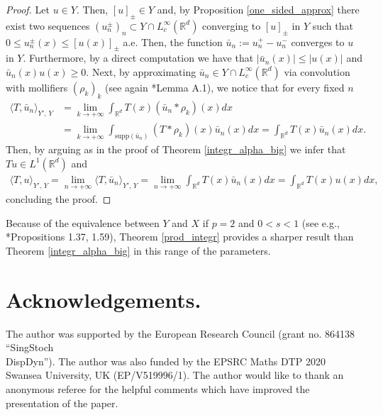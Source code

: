 \documentclass[letterpaper, 11pt,  reqno]{amsart}
\theoremstyle{definition}
\theoremstyle{remark}
\numberwithin{equation}{section}
\newcommand{\R}{{\mathbb R}}
\begin{document}
\begin{proof}
		Let $u\in Y$. Then, $[u]_{\pm}\in Y$ and, by Proposition \ref{one_sided_approx} there exist two sequences ${(u^{\pm}_n)}_{n}\subset Y\cap L^{\infty}_c(\R^d)$ converging to $[u]_{\pm}$ in $Y$ such that $0\le u^{\pm}_n(x)\le [u(x)]_{\pm}$ a.e. Then, the function $\bar{u}_n:=u^{+}_n-u^{-}_{n}$ converges to $u$ in $Y$. Furthermore, by a direct computation we have that 
		$|\bar{u}_n(x)|\le |u(x)|$ and $\bar{u}_n(x)u(x)\ge 0$. Next, by approximating $\bar{u}_n\in Y\cap L^{\infty}_c(\R^d)$ via convolution with mollifiers $(\rho_k)_k$ (see again \cite{characterisation}*{Lemma A.1}), we notice that for every fixed $n$
		\begin{equation*}
			\begin{split}
				\langle T, \bar{u}_n\rangle_{Y',\, Y} 
				&=\lim_{k\to +\infty}\int_{\R^d}T(x)(\bar{u}_n*\rho_k)(x)dx\\
				&= \lim_{k\to +\infty}\int_{\text{supp}(\bar{u}_n)}(T*\rho_k)(x)\bar{u}_n(x)dx =\int_{\R^d}T(x)\bar{u}_n(x)dx.	
			\end{split}
		\end{equation*}
		Then, by arguing as in the proof of Theorem \ref{integr_alpha_big} we infer that $Tu\in L^{1}(\R^d)$ and 
		\begin{equation*}\label{eq10_boh}
			\begin{split}
				\langle T, u\rangle_{Y',\, Y}=\!\lim_{n\to +\infty}\langle T, \bar{u}_n \rangle_{Y',\,Y}\!
				=\! \lim_{n\to +\infty}\int_{\R^d}T(x)\bar{u}_n(x)dx\!=\!\int_{\R^d}T(x)u(x)dx,
			\end{split}
		\end{equation*}
	concluding the proof.
	\end{proof}
\remark \label{rm_last}Because of the equivalence between $Y$ and $X$ if $p=2$ and $0<s<1$ (see e.g., \cite{classicbook}*{Propositions 1.37, 1.59}), Theorem \ref{prod_integr} provides a sharper result than Theorem \ref{integr_alpha_big} in this range of the parameters.
\vspace{1mm}

\noindent
\section*{Acknowledgements.} The author was supported by the European Research Council
(grant no. 864138 ``SingStoch\\
DispDyn''). The author was also funded by the EPSRC Maths DTP
2020 Swansea University, UK (EP/V519996/1). The author would like to thank an anonymous referee for the helpful
comments which have improved the presentation of the paper.
\end{document}
